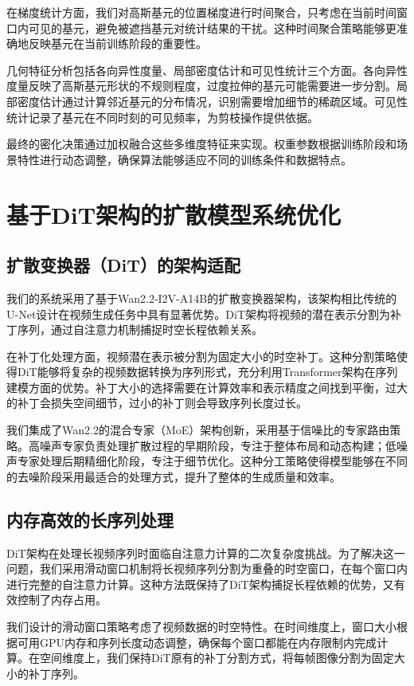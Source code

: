 在梯度统计方面，我们对高斯基元的位置梯度进行时间聚合，只考虑在当前时间窗口内可见的基元，避免被遮挡基元对统计结果的干扰。这种时间聚合策略能够更准确地反映基元在当前训练阶段的重要性。

几何特征分析包括各向异性度量、局部密度估计和可见性统计三个方面。各向异性度量反映了高斯基元形状的不规则程度，过度拉伸的基元可能需要进一步分割。局部密度估计通过计算邻近基元的分布情况，识别需要增加细节的稀疏区域。可见性统计记录了基元在不同时刻的可见频率，为剪枝操作提供依据。

最终的密化决策通过加权融合这些多维度特征来实现。权重参数根据训练阶段和场景特性进行动态调整，确保算法能够适应不同的训练条件和数据特点。

\section{基于DiT架构的扩散模型系统优化}

\subsection{扩散变换器（DiT）的架构适配}

我们的系统采用了基于Wan2.2-I2V-A14B的扩散变换器架构，该架构相比传统的U-Net设计在视频生成任务中具有显著优势。DiT架构将视频的潜在表示分割为补丁序列，通过自注意力机制捕捉时空长程依赖关系。

在补丁化处理方面，视频潜在表示被分割为固定大小的时空补丁。这种分割策略使得DiT能够将复杂的视频数据转换为序列形式，充分利用Transformer架构在序列建模方面的优势。补丁大小的选择需要在计算效率和表示精度之间找到平衡，过大的补丁会损失空间细节，过小的补丁则会导致序列长度过长。

我们集成了Wan2.2的混合专家（MoE）架构创新，采用基于信噪比的专家路由策略。高噪声专家负责处理扩散过程的早期阶段，专注于整体布局和动态构建；低噪声专家处理后期精细化阶段，专注于细节优化。这种分工策略使得模型能够在不同的去噪阶段采用最适合的处理方式，提升了整体的生成质量和效率。

\subsection{内存高效的长序列处理}

DiT架构在处理长视频序列时面临自注意力计算的二次复杂度挑战。为了解决这一问题，我们采用滑动窗口机制将长视频序列分割为重叠的时空窗口，在每个窗口内进行完整的自注意力计算。这种方法既保持了DiT架构捕捉长程依赖的优势，又有效控制了内存占用。

我们设计的滑动窗口策略考虑了视频数据的时空特性。在时间维度上，窗口大小根据可用GPU内存和序列长度动态调整，确保每个窗口都能在内存限制内完成计算。在空间维度上，我们保持DiT原有的补丁分割方式，将每帧图像分割为固定大小的补丁序列。


